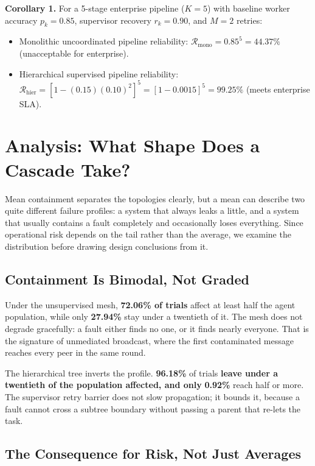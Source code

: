 \documentclass{article}
\begin{document}
\textbf{Corollary 1.} For a 5-stage enterprise pipeline ($K = 5$) with baseline worker accuracy $p_k = 0.85$, supervisor recovery $r_k = 0.90$, and $M = 2$ retries:
\begin{itemize}
  \item Monolithic uncoordinated pipeline reliability: $\mathcal{R}_{\text{mono}} = 0.85^5 = 44.37\%$ (unacceptable for enterprise).
  \item Hierarchical supervised pipeline reliability: $\mathcal{R}_{\text{hier}} = [1 - (0.15)(0.10)^2]^5 = [1 - 0.0015]^5 = 99.25\%$ (meets enterprise SLA).
\end{itemize}




\section{Analysis: What Shape Does a Cascade Take?}


Mean containment separates the topologies clearly, but a mean can describe two
quite different failure profiles: a system that always leaks a little, and a system
that usually contains a fault completely and occasionally loses everything. Since
operational risk depends on the tail rather than the average, we examine the
distribution before drawing design conclusions from it.


\subsection{Containment Is Bimodal, Not Graded}


Under the unsupervised mesh, \textbf{72.06\% of trials}
affect at least half the agent population, while only
\textbf{27.94\%} stay under a twentieth of it. The mesh
does not degrade gracefully: a fault either finds no one, or it finds nearly
everyone. That is the signature of unmediated broadcast, where the first
contaminated message reaches every peer in the same round.

The hierarchical tree inverts the profile. \textbf{96.18\%}
of trials\textbf{ leave under a twentieth of the population affected, and only}
\textbf{0.92\%} reach half or more. The supervisor
retry barrier does not slow propagation; it bounds it, because a fault cannot cross
a subtree boundary without passing a parent that re-lets the task.


\subsection{The Consequence for Risk, Not Just Averages}
\end{document}
